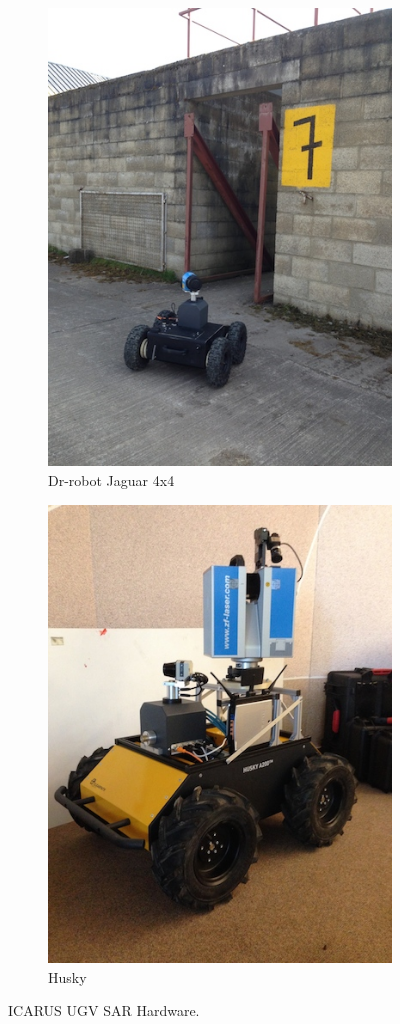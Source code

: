 \documentclass{article}
\begin{document}
\begin{figure} [h]
    \centering
    \begin{subfigure} [br]{0.4\textwidth}
         \centering
         \includegraphics[scale=0.55]{ROB-15-0035_fig18a.png}
         \caption{Dr-robot Jaguar 4x4}
         \label{fig:drrobot}
    \end{subfigure}
    \begin{subfigure} [bl]{0.4\textwidth}
         \centering
         \includegraphics[scale=0.55]{ROB-15-0035_fig18b.png}
         \caption{Husky}
         \label{fig:husky}
    \end{subfigure}%
    \caption{ICARUS UGV SAR Hardware.}
    \label{fig:SARrobotichardware}
\end{figure}
\end{document}
